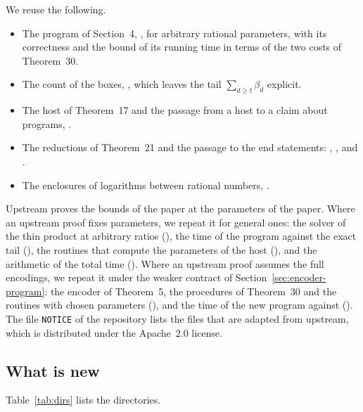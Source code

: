 We reuse the following.
\begin{itemize}
\item The program of Section~4, , for arbitrary rational
  parameters, with its correctness and the bound of its running time in terms
  of the two costs of Theorem~30.
\item The count of the boxes, , which leaves the tail
  \(\sum_{d\ge t}\beta_d\) explicit.
\item The host of Theorem~17 and the passage from a host to a claim about
  programs, .
\item The reductions of Theorem~21 and the passage to the end statements:
  , ,
   and .
\item The enclosures of logarithms between rational numbers, .
\end{itemize}
Upstream proves the bounds of the paper at the parameters of the paper.  Where
an upstream proof fixes parameters, we repeat it for general ones: the solver
of the thin product at arbitrary ratios (), the
time of the program against the exact tail (), the routines that
compute the parameters of the host (), and the arithmetic
of the total time ().  Where an upstream proof assumes the full
encodings, we repeat it under the weaker contract of
Section~\ref{sec:encoder-program}: the encoder of Theorem~5, the procedures of
Theorem~30 and the routines with chosen parameters (), and
the time of the new program against  ().  The file
\texttt{NOTICE} of the repository lists the files that are adapted from
upstream, which is distributed under the Apache~2.0 license.

\subsection{What is new}

Table~\ref{tab:dirs} lists the directories.

